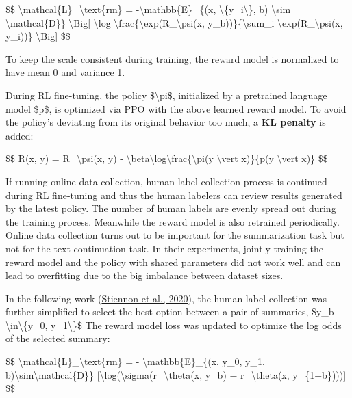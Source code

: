 \$\$ \textbackslash mathcal\{L\}\_\textbackslash text\{rm\} = -\textbackslash mathbb\{E\}\_\{(x, \textbackslash\{y\_i\textbackslash\}, b) \textbackslash sim \textbackslash mathcal\{D\}\} \textbackslash Big{[} \textbackslash log \textbackslash frac\{\textbackslash exp(R\_\textbackslash psi(x, y\_b))\}\{\textbackslash sum\_i \textbackslash exp(R\_\textbackslash psi(x, y\_i))\} \textbackslash Big{]} \$\$

To keep the scale consistent during training, the reward model is normalized to have mean 0 and variance 1.

\label{kl-penalty}{}During RL fine-tuning, the policy \$\textbackslash pi\$, initialized by a pretrained language model \$p\$, is optimized via \href{https://lilianweng.github.io/posts/2018-04-08-policy-gradient/\#ppo}{PPO} with the above learned reward model. To avoid the policy's deviating from its original behavior too much, a \textbf{KL penalty} is added:

\$\$ R(x, y) = R\_\textbackslash psi(x, y) - \textbackslash beta\textbackslash log\textbackslash frac\{\textbackslash pi(y \textbackslash vert x)\}\{p(y \textbackslash vert x)\} \$\$

If running online data collection, human label collection process is continued during RL fine-tuning and thus the human labelers can review results generated by the latest policy. The number of human labels are evenly spread out during the training process. Meanwhile the reward model is also retrained periodically. Online data collection turns out to be important for the summarization task but not for the text continuation task. In their experiments, jointly training the reward model and the policy with shared parameters did not work well and can lead to overfitting due to the big imbalance between dataset sizes.

In the following work (\href{https://arxiv.org/abs/2009.01325}{Stiennon et al., 2020}), the human label collection was further simplified to select the best option between a pair of summaries, \$y\_b \textbackslash in\textbackslash\{y\_0, y\_1\textbackslash\}\$ The reward model loss was updated to optimize the log odds of the selected summary:

\$\$ \textbackslash mathcal\{L\}\_\textbackslash text\{rm\} = - \textbackslash mathbb\{E\}\_\{(x, y\_0, y\_1, b)\textbackslash sim\textbackslash mathcal\{D\}\} {[}\textbackslash log(\textbackslash sigma(r\_\textbackslash theta(x, y\_b) − r\_\textbackslash theta(x, y\_\{1−b\}))){]} \$\$

